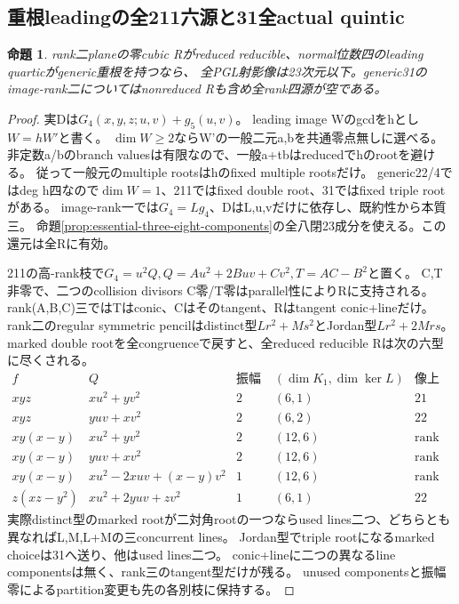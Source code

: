 \documentclass[a4paper,11pt]{ltjsarticle}
\newtheorem{proposition}{命題}[section]
\theoremstyle{definition}
\begin{document}
\subsection{重根leadingの全211六源と31全actual quintic}
\begin{proposition}\label{prop:plane-m4-repeated-reduced-G}
rank二planeの零cubic Rがreduced reducible、normal位数四のleading quarticがgeneric重根を持つなら、
全PGL射影像は23次元以下。generic31のimage-rank二についてはnonreduced Rも含め全rank四源が空である。
\end{proposition}
\begin{proof}
実Dは$G_4(x,y,z;u,v)+g_5(u,v)$。
leading image Wのgcdをhとし$W=hW'$と書く。
$\dim W\ge2$ならW'の一般二元a,bを共通零点無しに選べる。
非定数a/bのbranch valuesは有限なので、一般a+tbはreducedでhのrootを避ける。
従って一般元のmultiple rootsはhのfixed multiple rootsだけ。
generic22/4ではdeg h四なので$\dim W=1$、211ではfixed double root、31ではfixed triple rootがある。
image-rank一では$G_4=L g_4$、DはL,u,vだけに依存し、既約性から本質三。
命題\ref{prop:essential-three-eight-components}の全八閉23成分を使える。この還元は全Rに有効。

211の高-rank枝で$G_4=u^2Q,Q=Au^2+2Buv+Cv^2,T=AC-B^2$と置く。
C,T非零で、二つのcollision divisors C零/T零はparallel性によりRに支持される。
rank(A,B,C)三ではTはconic、Cはそのtangent、Rはtangent conic+lineだけ。
rank二のregular symmetric pencilはdistinct型$Lr^2+Ms^2$とJordan型$Lr^2+2Mrs$。
marked double rootを全congruenceで戻すと、全reduced reducible Rは次の六型に尽くされる。
\[
\begin{array}{c|c|c|c|c}
 f&Q&\text{振幅次元}&(\dim K_1,\dim\ker L)&\text{像上界}\\\hline
 xyz&xu^2+yv^2&2&(6,1)&21\\
 xyz&yuv+xv^2&2&(6,2)&22\\
 xy(x-y)&xu^2+yv^2&2&(12,6)&\text{rank四空}\\
 xy(x-y)&yuv+xv^2&2&(12,6)&\text{rank四空}\\
 xy(x-y)&xu^2-2xuv+(x-y)v^2&1&(12,6)&\text{rank四空}\\
 z(xz-y^2)&xu^2+2yuv+zv^2&1&(6,1)&22
\end{array}
\]
実際distinct型のmarked rootが二対角rootの一つならused lines二つ、どちらとも異なればL,M,L+Mの三concurrent lines。
Jordan型でtriple rootになるmarked choiceは31へ送り、他はused lines二つ。
conic+lineに二つの異なるline componentsは無く、rank三のtangent型だけが残る。
unused componentsと振幅零によるpartition変更も先の各別枝に保持する。


\end{proof}
\end{document}
